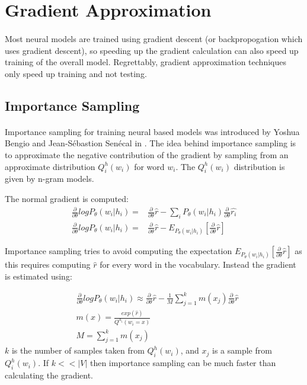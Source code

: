 \section{Gradient Approximation}
\paragraph{}
Most neural models are trained using gradient descent (or backpropogation which uses gradient descent), so speeding up the gradient calculation can also speed up training of the overall model. Regrettably, gradient approximation techniques only speed up training and not testing. 

\subsection{Importance Sampling}
\paragraph{}
Importance sampling for training neural based models was introduced by Yoshua Bengio and Jean-S\'{e}bastion Sen\'{e}cal in \cite{BengioSenecal2003}.
The idea behind importance sampling is to approximate the negative contribution of the gradient by sampling from an approximate distribution $Q^h_i(w_i)$ for word $w_i$. The $Q^h_i(w_i)$ distribution is given by n-gram models. 

The normal gradient is computed:
\begin{align}
\frac{\partial}{\partial \theta} log P_{\theta}(w_i| h_i) =& \frac{\partial}{\partial \theta} \hat{r} - \sum_i P_{\theta}(w_i| h_i) \frac{\partial}{\partial \theta} \hat{r_i} 
\\ \frac{\partial}{\partial \theta} log P_{\theta}(w_i| h_i) =& \frac{\partial}{\partial \theta} \hat{r} - E_{P_{\theta}(w_i| h_i)} \left[ \frac{\partial}{\partial \theta} \hat{r} \right] \nonumber
\end{align}

Importance sampling tries to avoid computing the expectation $E_{P_{\theta}(w_i| h_i)} \left[ \frac{\partial}{\partial \theta} \hat{r} \right]$ as this requires computing $\hat{r}$ for every word in the vocabulary. Instead the gradient is estimated using:

\begin{align}
&\frac{\partial}{\partial \theta} log P_{\theta}(w_i| h_i) \approx  \frac{\partial}{\partial \theta} \hat{r} - \frac{1}{M} \sum_{j=1}^k m(x_j) \frac{\partial}{\partial \theta} \hat{r}
\\ &m(x) =  \frac{exp(\hat{r})}{Q^{h_i}(w_i=x)} \nonumber
\\ &M= \sum_{j=1}^k m(x_j) \nonumber
\end{align}
$k$ is the number of samples taken from $Q^h_i(w_i)$, and $x_j$ is a sample from  $Q^h_i(w_i)$. If $k << |V|$ then importance sampling can be much faster than calculating the gradient.

